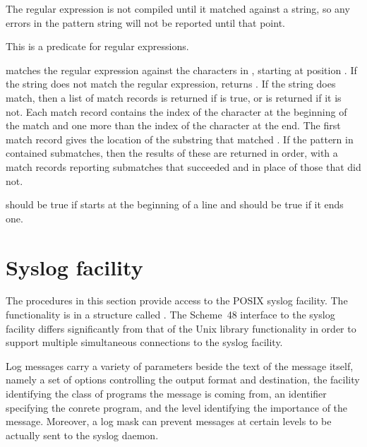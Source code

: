 The regular expression is not compiled until it matched against a string,
 so any errors in the pattern string will not be reported until that
 point.

\begin{protos}
\end{protos}
\noindent
This is a predicate for regular expressions.

\begin{protos}
\end{protos}
\noindent
{} matches the regular expression against the characters
 in , starting at position .
If the string does not match the regular expression, 
 returns .
If the string does match, then a list of match records is returned
 if  is true, or  is returned if it is not.
Each match record contains the index of the character at the beginning
 of the match and one more than the index of the character at the end.
The first match record gives the location of the substring that matched
 .
If the pattern in  contained submatches, then the results
 of these are returned in order, with a match records reporting submatches
 that succeeded and  in place of those that did not.

 should be true if  starts at the beginning
 of a line and  should be true if it ends one.

\section{Syslog facility}
\label{syslog-facility}

The procedures in this section provide access to the POSIX syslog
facility.  The functionality is in a structure called
.  The Scheme~48 interface to the
syslog facility differs significantly from that of the Unix library
functionality in order to support multiple simultaneous connections to
the syslog facility.

Log messages carry a variety of parameters beside the text of the
message itself, namely a set of options controlling the output format
and destination, the facility identifying the class of programs the
message is coming from, an identifier specifying the conrete program,
and the level identifying the importance of the message.  Moreover, a
log mask can prevent messages at certain levels to be actually sent to
the syslog daemon.

